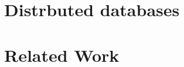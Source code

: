 %

\chapter{Distrbuted databases}
\label{ch:my-domain}


% 

\chapter{Related Work}
\label{ch:related-work}
